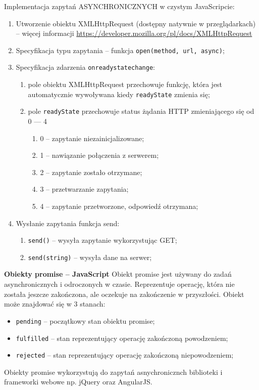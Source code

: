 Implementacja zapytań ASYNCHRONICZNYCH w czystym JavaScripcie:
\begin{enumerate}
\item Utworzenie obiektu XMLHttpRequest (dostępny natywnie w przeglądarkach) -- więcej informacji \url{https://developer.mozilla.org/pl/docs/XMLHttpRequest}
\item Specyfikacja typu zapytania -- funkcja \texttt{open(method, url, async)};
\item Specyfikacja zdarzenia \texttt{onreadystatechange}:
\begin{enumerate}
\item pole obiektu XMLHttpRequest przechowuje funkcję, która jest automatycznie wywoływana kiedy \texttt{readyState} zmienia się;
\item pole \texttt{readyState} przechowuje status żądania HTTP zmieniającego się od 0 --- 4
\begin{enumerate}
\item 0 -- zapytanie niezainicjalizowane;
\item 1 -- nawiązanie połączenia z serwerem;
\item 2 -- zapytanie zostało otrzymane;
\item 3 -- przetwarzanie zapytania;
\item 4 -- zapytanie przetworzone, odpowiedź otrzymana;
\end{enumerate}
\end{enumerate}
\item Wysłanie zapytania funkcja send:
\begin{enumerate}
\item \texttt{send()} -- wysyła zapytanie wykorzystując GET;
\item \texttt{send(string)} -- wysyła dane na serwer;
\end{enumerate}
\end{enumerate}

\textbf{Obiekty promise -- JavaScript}
Obiekt promise jest używany do zadań asynchronicznych i odroczonych w czasie. Reprezentuje operację, która nie została jeszcze zakończona, ale oczekuje na zakończenie w przyszłości. Obiekt może znajdować się w 3 stanach:
\begin{itemize}
\item \texttt{pending} -- początkowy stan obiektu promise;
\item \texttt{fulfilled} -- stan reprezentujący operację zakończoną powodzeniem;
\item \texttt{rejected} -- stan reprezentujący operację zakończoną niepowodzeniem;
\end{itemize}
Obiekty promise wykorzystują do zapytań asnychronicznch biblioteki i frameworki webowe np. jQuery oraz AngularJS.


